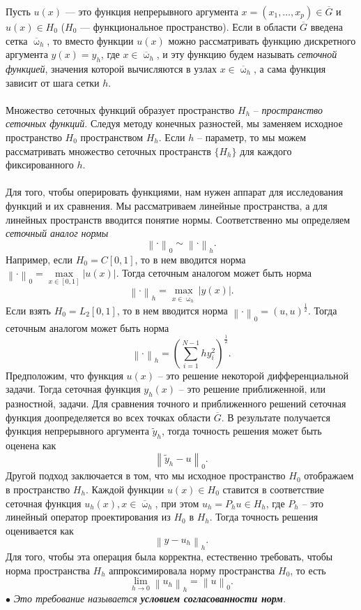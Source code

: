 \documentclass[a4paper, 12pt]{report}
\numberwithin{equation}{section}
\newcommand{\ol}{\overline}
\renewcommand{\omega}{\upomega}
\newcommand\Norm[1]{\left\| #1 \right\|}
\begin{document}
Пусть $u(x)$ --- это функция непрерывного аргумента $x = (x_1, \ldots, x_p)\in \overline G$ и $u(x) \in H_0$ ($H_0$ --- функциональное пространство). Если в области $\overline G$ введена сетка $\overline \omega_h$, то вместо функции $u(x)$ можно рассматривать функцию дискретного аргумента $y(x) = y_h$, где $x\in \ol \omega _h$, и эту функцию будем называть \textit{сеточной функцией}, значения которой вычисляются в узлах $x \in \overline \omega_h$, а сама функция зависит от шага сетки $h$.\\\\
Множество сеточных функций образует пространство $H_h$ -- \textit{пространство сеточных функций}. Следуя методу конечных разностей, мы заменяем исходное пространство $H_0$ пространством $H_h$. Если $h$ -- параметр, то мы можем рассматривать множество сеточных пространств $\{H_h\}$ для каждого фиксированного $h$.\\\\
Для того, чтобы оперировать функциями, нам нужен аппарат для исследования функций и их сравнения. Мы рассматриваем линейные пространства, а для линейных пространств вводится понятие нормы. Соответственно мы определяем \textit{сеточный аналог нормы} $$\Norm {\cdot}_0 \sim \Norm {\cdot} _h.$$
Например, если $H_ 0 = C[0,1]$, то в нем вводится норма $\Norm {\cdot}_0 = \underset{x\in [0,1]} {\max}|u(x)|$. Тогда сеточным аналогом может быть норма $$\Norm {\cdot}_h = \underset{x \in \ol \omega_h}{\max}|y(x)|.$$
Если взять $H_ 0 = L_2[0,1]$, то в нем вводится норма $\Norm {\cdot}_0 = (u,u)^\frac12$. Тогда сеточным аналогом может быть норма $$\Norm {\cdot}_h = \left(\sum_{i=1}^{N-1}hy_i^2\right)^\frac12.$$
Предположим, что функция $u(x)$ -- это решение некоторой дифференциальной задачи. Тогда сеточная функция $y_h(x)$ -- это решение приближенной, или разностной, задачи. Для сравнения точного и приближенного решений сеточная функция доопределяется во всех точках области $\ol G$. В результате получается функция непрерывного аргумента $\widetilde{y}_h$, тогда точность решения может быть оценена как $$\Norm{\widetilde{y}_h - u}_0.$$
Другой подход заключается в том, что мы исходное пространство $H_0$ отображаем в пространство $H_h$. Каждой функции $u(x)\in H_0$ ставится в соответствие сеточная функция $u_h(x), x \in \ol \omega _h$, при этом $u_h = P_h u \in H_h$, где $P_h$ -- это линейный оператор проектирования из $H_0$ в $H_h$. Тогда точность решения оценивается как $$\Norm{y-u_h}_h.$$ Для того, чтобы эта операция была корректна, естественно требовать, чтобы норма пространства $H_h$ аппроксимировала норму пространства $H_0$, то есть $$\lim\limits_{h\to 0}\Norm{u_h}_h = \Norm{u}_0.$$
$\bullet$ \textit{Это требование называется \textbf{условием согласованности норм}.}\\\\
\end{document}
